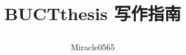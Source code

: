 
%

\newcommand{\addfig}[4][.5\textwidth]{%
	\begin{figure}[H]
		\centering
		\texttt{[image: \#2]}
		\caption{#3}\label{#4}
	\end{figure}}

\newcommand\Vector{\symbfit}
\newcommand\Matrix{\symbfit}


\title{BUCTthesis 写作指南\par\version}
\author{Miracle0565}


\RequirePackage{bxtexlogo}
\RequirePackage{zhlipsum}
\newcommand{\version}{Beta.v0.9.5}
\newcommand{\cmd}[1]{\texttt{\textbackslash#1}}
\newcommand{\file}{\textsf}
\newcommand{\pkg}{\textsf}
\newcommand{\env}{\texttt}
\newcommand{\opt}{\texttt}
\newcommand{\argu}[1]{\{$\langle$\textit{#1}$\rangle$\}}
\newcommand{\cargu}[1]{$\langle$\textit{#1}$\rangle$}
